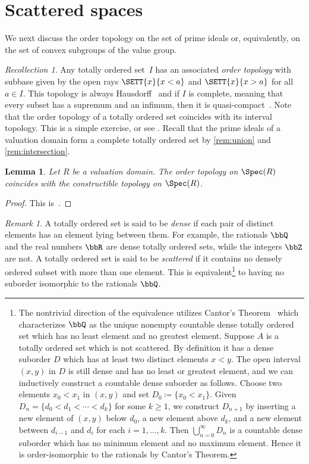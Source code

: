\documentclass{amsart}
\numberwithin{equation}{section}%
\newtheorem{Lem}[equation]{Lemma}
\theoremstyle{remark}
\newtheorem{Rem}[equation]{Remark}
\newtheorem{Rec}[equation]{Recollection}
\begin{document}
\section{Scattered spaces}\label{sec:scattered}

We next discuss the order topology on the set of prime ideals or, equivalently, on the set of convex subgroups of the value group.

\begin{Rec}
	Any totally ordered set~$I$ has an associated \emph{order topology} with subbase given by the open rays $\SETT{x}{x < a}$ and $\SETT{x}{x > a}$ for all $a \in I$. This topology is always Hausdorff~\cite[Theorem~1]{Erne80} and if $I$ is complete, meaning that every subset has a supremum and an infimum, then it is quasi-compact~\cite[Theorem~9]{Frink42}. Note that the order topology of a totally ordered set coincides with its interval topology. This is a simple exercise, or see \cite[Theorem~3]{Frink42}. Recall that the prime ideals of a valuation domain form a complete totally ordered set by \cref{rem:union} and \cref{rem:intersection}.
\end{Rec}

\begin{Lem}\label{lem:constructible}
	Let $R$ be a valuation domain. The order topology on $\Spec(R)$ coincides with the constructible topology on $\Spec(R)$.
\end{Lem}

\begin{proof}
	This is~\cite[Theorem~1.6.4]{DickmannSchwartzTressl19}.
\end{proof}

\begin{Rem}
	A totally ordered set is said to be \emph{dense} if each pair of distinct elements has an element lying between them. For example, the rationals $\bbQ$ and the real numbers $\bbR$ are dense totally ordered sets, while the integers $\bbZ$ are not. A totally ordered set is said to be \emph{scattered} if it contains no densely ordered subset with more than one element. This is equivalent\footnote{The nontrivial direction of the equivalence utilizes Cantor's Theorem~\cite[Theorem II.2.5]{Rosenstein82} which characterizes $\bbQ$ as the unique nonempty countable dense totally ordered set which has no least element and no greatest element. Suppose $A$ is a totally ordered set which is not scattered. By definition it has a dense suborder $D$ which has at least two distinct elements $x < y$. The open interval $(x,y)$ in $D$ is still dense and has no least or greatest element, and we can inductively construct a countable dense suborder as follows. Choose two elements $x_0<x_1$ in $(x,y)$ and set $D_0 \coloneqq \{x_0 < x_1\}$. Given $D_n = \{d_0 < d_1 < \cdots < d_k\}$ for some $k \geq 1$, we construct $D_{n+1}$ by inserting a new element of $(x,y)$ below $d_0$, a new element above $d_k$, and a new element between $d_{i-1}$ and $d_i$ for each $i=1,\ldots,k$. Then $\bigcup_{n=0}^\infty D_n$ is a countable dense suborder which has no minimum element and no maximum element. Hence it is order-isomorphic to the rationals by Cantor's Theorem.} to having no suborder isomorphic to the rationals $\bbQ$.
\end{Rem}
\end{document}
